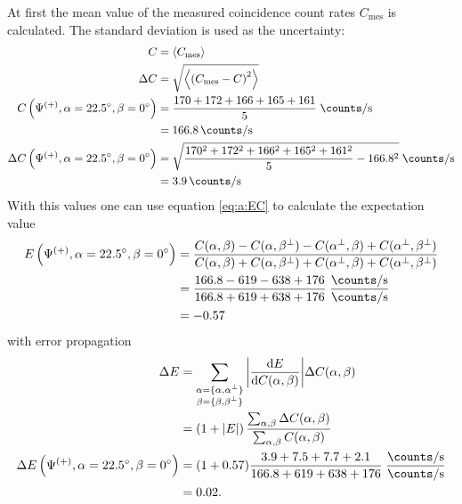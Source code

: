 At first the mean value of the measured coincidence count rates $C_\text{mes}$ is calculated.
The standard deviation is used as the uncertainty:
\begin{align}
C
    &= \left\langle C_\text{mes}\right\rangle
    \label{eq:a:Cmean}\\
\Delta C
    &= \sqrt{\left\langle \left(C_\text{mes}-C\right)^2\right\rangle}
    \label{eq:a:dC}\\
C\left(\Psi^{(+)},\alpha=\SI{22.5}{\degree},\beta=\SI{0}{\degree}\right)
    &=\frac{170+172+166+165+161}{5}\;\si{\counts\per\second}
    \nonumber\\
    &=\SI{166.8}{\counts\per\second}
\nonumber\\
\Delta C\left(\Psi^{(+)},\alpha=\SI{22.5}{\degree},\beta=\SI{0}{\degree}\right)
    &=\sqrt{\frac{170^2+172^2+166^2+165^2+161^2}{5}-166.8^2}\;\si{\counts\per\second}
    \nonumber\\
    &=\SI{3.9}{\counts\per\second}
    \nonumber
\end{align}
With this values one can use equation \eqref{eq:a:EC} to calculate the expectation value
\begin{align*}
E\left(\Psi^{(+)},\alpha=\SI{22.5}{\degree},\beta=\SI{0}{\degree}\right)
    &=\frac{C(\alpha,\beta)-C(\alpha,\beta^\perp)-C(\alpha^\perp,\beta)+C(\alpha^\perp,\beta^\perp)}{C(\alpha,\beta)+C(\alpha,\beta^\perp)+C(\alpha^\perp,\beta)+C(\alpha^\perp,\beta^\perp)}
    \\
    &=\frac{166.8-619-638+176}{166.8+619+638+176}\;\frac{\si{\counts\per\second}}{\si{\counts\per\second}}
    \\
    &=-0.57
\end{align*}
with error propagation
\begin{subequations}
\label{eq:a:dE}
\begin{align}
\Delta E
    &= \sum_{\substack{\alpha=\lbrace\alpha,\alpha^\perp\rbrace\\\beta=\lbrace\beta,\beta^\perp\rbrace}}\abs{\frac{\dd E}{\dd C(\alpha,\beta)}}\Delta C(\alpha,\beta)
    \label{eq:a:dE:1}\\
    &=\left(1+\abs{E}\right)\frac{\sum_{\alpha,\beta}\Delta C(\alpha,\beta)}{\sum_{\alpha,\beta}C(\alpha,\beta)}
    \label{eq:a:dE:2}\\
\Delta E\left(\Psi^{(+)},\alpha=\SI{22.5}{\degree},\beta=\SI{0}{\degree}\right)
    &=(1+0.57)\frac{3.9+7.5+7.7+2.1}{166.8+619+638+176}\;\frac{\si{\counts\per\second}}{\si{\counts\per\second}}
    \nonumber\\
    &=0.02.
    \nonumber
\end{align}
\end{subequations}
